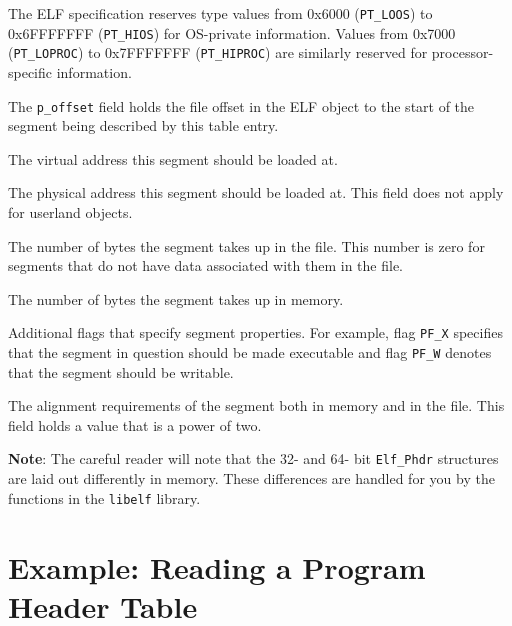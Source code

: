 \documentclass[a4paper,pdftex]{book}
\makeatletter
\newcommand{\constant}[1]{\texttt{#1}}
\newcommand{\library}[1]{\texttt{#1}}
\newcommand{\parameter}[1]{\texttt{#1}}
\newcommand{\type}[1]{\texttt{#1}}
\newenvironment{callout}[2][black]{%
  \begingroup\newcommand{\@cocolor}{#1}%
  \setlength{\shadowsize}{1.2pt}%
  \newcommand{\@cogroup}[1]{#2}}{\endgroup}
\newcommand{\@co}[1]{\shadowbox{\color{\@cocolor}#1}}
\newcommand{\coref}[1]{%
  \hypertarget{\@cogroup.#1.cr}{%
    \hyperlink{\@cogroup.#1.co}{\@co{#1}}}}
\makeatother
\begin{document}
\begin{callout}{phdr}
\begin{description}
    The ELF specification reserves type values from 0x6000
    (\constant{PT\_LOOS}) to 0x6FFF\-FFFF (\constant{PT\_HIOS}) for
    OS-private information.  Values from 0x7000
    (\constant{PT\_LOPROC}) to 0x7FFF\-FFFF (\constant{PT\_HIPROC})
    are similarly reserved for processor-specific information.%

  \item[\coref{2}] The \parameter{p\_offset} field holds the file
    offset in the ELF object to the start of the segment being
    described by this table entry.%

  \item[\coref{3}] The virtual address this segment should be loaded
    at.%

  \item[\coref{4}] The physical address this segment should be loaded
    at.  This field does not apply for userland objects.

  \item[\coref{5}] The number of bytes the segment takes up in the
    file.  This number is zero for segments that do not have data
    associated with them in the file.%

  \item[\coref{6}] The number of bytes the segment takes up in memory.%

  \item[\coref{7}] Additional flags that specify segment properties.
    For example, flag \constant{PF\_X} specifies that the segment in
    question should be made executable and flag \constant{PF\_W}
    denotes that the segment should be writable.%

  \item[\coref{8}] The alignment requirements of the segment both in
    memory and in the file.  This field holds a value that is a power
    of two.%
  \end{description}
\end{callout}

\textbf{Note}: The careful reader will note that the 32- and 64- bit
\type{Elf\_Phdr} structures are laid out differently in memory.  These
differences are handled for you by the functions in the
\library{libelf} library.

\section{Example: Reading a Program Header Table}
\end{document}
